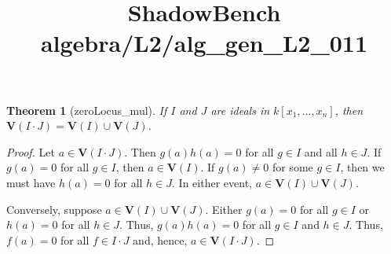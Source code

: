 \documentclass{article}
\title{ShadowBench algebra/L2/alg\_gen\_L2\_011}
\newtheorem{theorem}{Theorem}
\begin{document}
\maketitle

\begin{theorem}[zeroLocus_mul]
If $I$ and $J$ are ideals in $k[x_1, \dots, x_n]$, then $\mathbf{V}(I \cdot J) = \mathbf{V}(I) \cup \mathbf{V}(J)$.
\end{theorem}

\begin{proof}
Let $a \in \mathbf{V}(I \cdot J)$. Then $g(a)h(a) = 0$ for all $g \in I$ and all $h \in J$. If $g(a) = 0$ for all $g \in I$, then $a \in \mathbf{V}(I)$. If $g(a) \neq 0$ for some $g \in I$, then we must have $h(a) = 0$ for all $h \in J$. In either event, $a \in \mathbf{V}(I) \cup \mathbf{V}(J)$.

Conversely, suppose $a \in \mathbf{V}(I) \cup \mathbf{V}(J)$. Either $g(a) = 0$ for all $g \in I$ or $h(a) = 0$ for all $h \in J$. Thus, $g(a)h(a) = 0$ for all $g \in I$ and $h \in J$. Thus, $f(a) = 0$ for all $f \in I \cdot J$ and, hence, $a \in \mathbf{V}(I \cdot J)$.
\end{proof}
\end{document}
